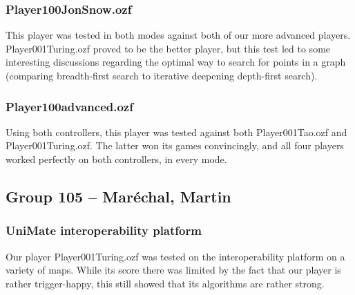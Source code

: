 \documentclass[12pt,journal]{IEEEtran}
\newcommand{\ntt}{\normalfont\ttfamily}
\newcommand{\fn}[1]{{\protect\ntt#1}}
\begin{document}
\subsubsection{Player100JonSnow.ozf}
This player was tested in both modes against both of our more advanced players.
\fn{Player001Turing.ozf} proved to be the better player, but this test led to some interesting discussions regarding the optimal way to search for points in a graph (comparing breadth-first search to iterative deepening depth-first search).

\subsubsection{\fn{Player100advanced.ozf}}
Using both controllers, this player was tested against both \fn{Player001Tao.ozf} and \fn{Player001Turing.ozf}.
The latter won its games convincingly, and all four players worked perfectly on both controllers, in every mode.

\subsection{Group 105 -- Maréchal, Martin}
\subsubsection{UniMate interoperability platform}
Our player \fn{Player001Turing.ozf} was tested on the interoperability platform on a variety of maps.
While its score there was limited by the fact that our player is rather trigger-happy, this still showed that its algorithms are rather strong.
\end{document}
